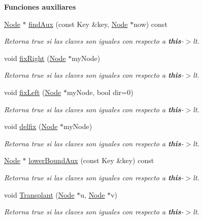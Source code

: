 \begin{Indent}{\bf Funciones auxiliares}
\begin{DoxyCompactItemize}
\hyperlink{structaed2_1_1map_1_1Node}{Node} $\ast$ \hyperlink{classaed2_1_1map_aceb6b18a1a35f3c9bab1d1c378f3d14b_aceb6b18a1a35f3c9bab1d1c378f3d14b}{find\-Aux} (const Key \&key, \hyperlink{structaed2_1_1map_1_1Node}{Node} $\ast$now) const 
\begin{DoxyCompactList}\small\item\em Retorna true si las claves son iguales con respecto a {\bfseries this}-\/$>$lt. \end{DoxyCompactList}\item 
void \hyperlink{classaed2_1_1map_ae908761d06411046290cf49a5e0618bd_ae908761d06411046290cf49a5e0618bd}{fix\-Right} (\hyperlink{structaed2_1_1map_1_1Node}{Node} $\ast$my\-Node)
\begin{DoxyCompactList}\small\item\em Retorna true si las claves son iguales con respecto a {\bfseries this}-\/$>$lt. \end{DoxyCompactList}\item 
void \hyperlink{classaed2_1_1map_ae69c26a9d27f538124cd827646e56feb_ae69c26a9d27f538124cd827646e56feb}{fix\-Left} (\hyperlink{structaed2_1_1map_1_1Node}{Node} $\ast$my\-Node, bool dir=0)
\begin{DoxyCompactList}\small\item\em Retorna true si las claves son iguales con respecto a {\bfseries this}-\/$>$lt. \end{DoxyCompactList}\item 
void \hyperlink{classaed2_1_1map_a056322ff63d37b43d042ffa0378c9fd2_a056322ff63d37b43d042ffa0378c9fd2}{delfix} (\hyperlink{structaed2_1_1map_1_1Node}{Node} $\ast$my\-Node)
\begin{DoxyCompactList}\small\item\em Retorna true si las claves son iguales con respecto a {\bfseries this}-\/$>$lt. \end{DoxyCompactList}\item 
\hyperlink{structaed2_1_1map_1_1Node}{Node} $\ast$ \hyperlink{classaed2_1_1map_a7690a8432874bad5f6cab403c1804bba_a7690a8432874bad5f6cab403c1804bba}{lower\-Bound\-Aux} (const Key \&key) const 
\begin{DoxyCompactList}\small\item\em Retorna true si las claves son iguales con respecto a {\bfseries this}-\/$>$lt. \end{DoxyCompactList}\item 
void \hyperlink{classaed2_1_1map_a6c9fb4a85c0e8d2de5dcbdbc0d695be5_a6c9fb4a85c0e8d2de5dcbdbc0d695be5}{Transplant} (\hyperlink{structaed2_1_1map_1_1Node}{Node} $\ast$u, \hyperlink{structaed2_1_1map_1_1Node}{Node} $\ast$v)
\begin{DoxyCompactList}\small\item\em Retorna true si las claves son iguales con respecto a {\bfseries this}-\/$>$lt. \end{DoxyCompactList}\end{DoxyCompactItemize}
\end{Indent}
